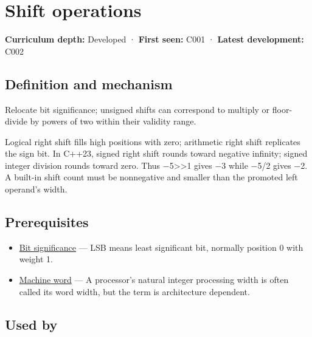 \hypertarget{appendix-73425b25118e}{}\label{referencestart:appendix-73425b25118e}
\section{Shift operations}\label{appendix-73425b25118e-shift-operations}

\textbf{Curriculum depth:} Developed · \textbf{First seen:} C001 · \textbf{Latest development:} C002

\begin{allmightroledefinition}

\subsection{Definition and mechanism}\label{appendix-73425b25118e-definition-and-mechanism}

Relocate bit significance; unsigned shifts can correspond to multiply or floor-divide by powers of two within their validity range.

\end{allmightroledefinition}

Logical right shift fills high positions with zero; arithmetic right shift replicates the sign bit. In C++23, signed right shift rounds toward negative infinity; signed integer division rounds toward zero. Thus −5\textgreater\textgreater1 gives −3 while −5/2 gives −2. A built-in shift count must be nonnegative and smaller than the promoted left operand's width.

\subsection{Prerequisites}\label{appendix-73425b25118e-prerequisites}

\begin{itemize}
\tightlist
\item
  \hyperref[appendix-280445746493]{Bit significance} --- LSB means least significant bit, normally position 0 with weight 1.
\item
  \hyperref[appendix-d67a19507dc5]{Machine word} --- A processor's natural integer processing width is often called its word width, but the term is architecture dependent.
\end{itemize}

\subsection{Used by}\label{appendix-73425b25118e-used-by}

